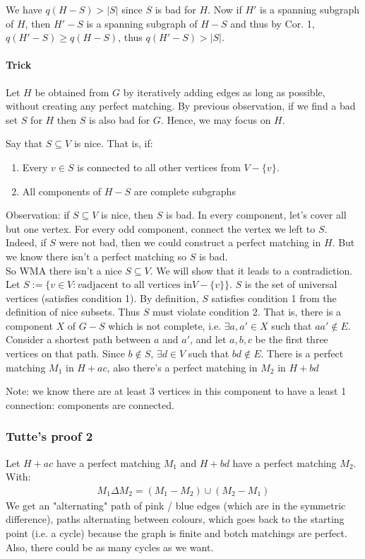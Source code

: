 \documentclass[11pt]{book}
\begin{document}
		We have $q(H -S) > |S|$ since $S$ is bad for $H$. Now if $H'$ is a spanning subgraph of $H$, then $H' - S$ is a spanning subgraph of $H -S$ and thus by Cor. 1, $q(H' - S) \geq q(H - S)$, thus $q(H' - S) > |S|$.
		
		\paragraph{Trick} Let $H$ be obtained from $G$ by iteratively adding edges as long as possible, without creating any perfect matching. By previous observation, if we find a bad set $S$ for $H$ then $S$ is also bad for $G$. Hence, we may focus on $H$.
		
		Say that $S \subseteq V$ is nice. That is, if:
		\begin{enumerate}
			\item Every $v \in S$ is connected to all other vertices from $V - \{ v \}$.
			\item All components of $H - S$ are complete subgraphs
		\end{enumerate}
		Observation: if $S \subseteq V$ is nice, then $S$ is bad. In every component, let's cover all but one vertex. For every odd component, connect the vertex we left to $S$. Indeed, if $S$ were not bad, then we could construct a perfect matching in $H$. But we know there isn't a perfect matching so $S$ is bad.\\
		
		So WMA there isn't a nice $S \subseteq V$. We will show that it leads to a contradiction. Let $S := \{ v \in V : v \text{adjacent to all vertices in} V - \{ v \} \}$. $S$ is the set of universal vertices (satisfies condition 1). By definition, $S$ satisfies condition 1 from the definition of nice subsets. Thus $S$ must violate condition 2. That is, there is a component $X$ of $G - S$ which is not complete, i.e. $\exists a, a' \in X$ such that $aa' \notin E$. Consider a shortest path between $a$ and $a'$, and let $a, b, c$ be the first three vertices on that path. Since $b \notin S$, $\exists d \in V$ such that $bd \notin E$. There is a perfect matching $M_1$ in $H + ac$, also there's a perfect matching in $M_2$ in $H + bd$ 
		
		Note: we know there are at least 3 vertices in this component to have a least 1 connection: components are connected.

		\subsubsection{Tutte's proof 2}
			Let $H + ac$ have a perfect matching $M_1$ and $H + bd $ have a perfect matching $M_2$.
			With:
			\begin{eqnarray}
				M_1 \Delta M_2 = (M_1 - M_2) \cup (M_2 - M_1)
			\end{eqnarray}
			We get an "alternating" path of pink / blue edges (which are in the symmetric difference), paths alternating between colours, which goes back to the starting point (i.e. a cycle) because the graph is finite and botch matchings are perfect. Also, there could be as many cycles as we want. \\
			
\end{document}
